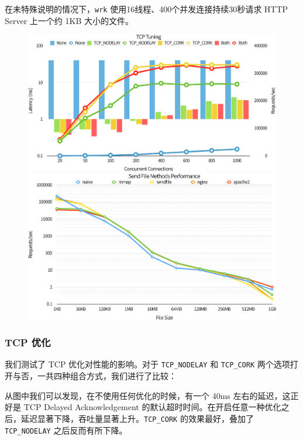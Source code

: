 \documentclass[a4paper]{article}
\begin{document}
在未特殊说明的情况下，\texttt{wrk} 使用16线程、400个并发连接持续30秒请求 HTTP Server 上一个约 1KB 大小的文件。

\begin{figure}[htbp]
\centering

\includegraphics[width=\textwidth]{./tcp_plot.eps}

\vspace*{\floatsep}%

\includegraphics[width=\textwidth]{./send_file_plot.eps}

\end{figure}

\subsubsection{TCP 优化}

我们测试了 TCP 优化对性能的影响。对于 \texttt{TCP\_NODELAY} 和 \texttt{TCP\_CORK} 两个选项打开与否，一共四种组合方式，我们进行了比较：


从图中我们可以发现，在不使用任何优化的时候，有一个 40ms 左右的延迟，这正好是 TCP Delayed Acknowledgement 的默认超时时间。在开启任意一种优化之后，延迟显著下降，吞吐量显著上升。\texttt{TCP\_CORK} 的效果最好，叠加了 \texttt{TCP\_NODELAY} 之后反而有所下降。
\end{document}
